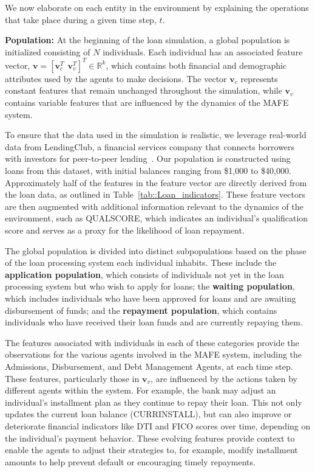 We now elaborate on each entity in the environment by explaining the operations that take place during a given time step, $t$.

\textbf{Population:} At the beginning of the loan simulation, a global population is initialized consisting of $N$ individuals. Each individual has an associated feature vector, $\mathbf{v}=[\mathbf{v}_{c}^{T} \ \ \mathbf{v}_{v}^{T}]^{T} \in \mathbb{R}^k$, which contains both financial and demographic attributes used by the agents to make decisions. The vector $\mathbf{v}_{c}$ represents constant features that remain unchanged throughout the simulation, while $\mathbf{v}_{v}$ contains variable features that are influenced by the dynamics of the MAFE system.

To ensure that the data used in the simulation is realistic, we leverage real-world data from LendingClub, a financial services company that connects borrowers with investors for peer-to-peer lending~\cite{lendingclub_kaggle}. Our population is constructed using loans from this dataset, with initial balances ranging from \$1,000 to \$40,000. Approximately half of the features in the feature vector are directly derived from the loan data, as outlined in Table~\ref{tab::Loan_indicators}. These feature vectors are then augmented with additional information relevant to the dynamics of the environment, such as QUALSCORE, which indicates an individual's qualification score and serves as a proxy for the likelihood of loan repayment. 

The global population is divided into distinct subpopulations based on the phase of the loan processing system each individual inhabits. These include the \textbf{application population}, which consists of individuals not yet in the loan processing system but who wish to apply for loans; the \textbf{waiting population}, which includes individuals who have been approved for loans and are awaiting disbursement of funds; and the \textbf{repayment population}, which contains individuals who have received their loan funds and are currently repaying them.

The features associated with individuals in each of these categories provide the observations for the various agents involved in the MAFE system, including the Admissions, Disbursement, and Debt Management Agents, at each time step. These features, particularly those in $\mathbf{v}_{v}$, are influenced by the actions taken by different agents within the system. For example, the bank may adjust an individual's installment plan as they continue to repay their loan. This not only updates the current loan balance (CURRINSTALL), but can also improve or deteriorate financial indicators like DTI and FICO scores over time, depending on the individual’s payment behavior. These evolving features provide context to enable the agents to adjust their strategies to, for example, modify installment amounts to help prevent default or encouraging timely repayments.

